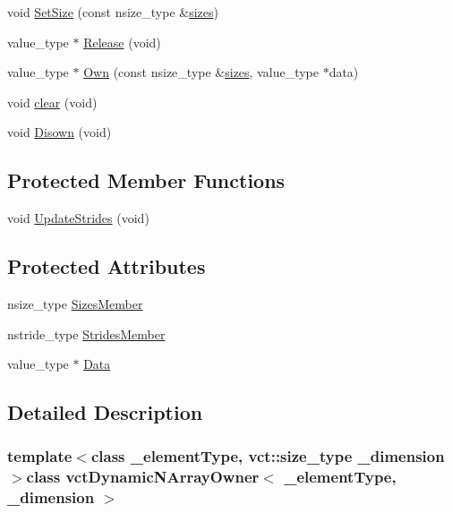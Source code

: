 \begin{DoxyCompactItemize}
\item 
void \hyperlink{classvct_dynamic_n_array_owner_ad3018a162b6670166cb3f2962c205fb2}{Set\-Size} (const nsize\-\_\-type \&\hyperlink{classvct_dynamic_n_array_owner_a014679026d1c8b3c3f07170c58ece520}{sizes})
\item 
value\-\_\-type $\ast$ \hyperlink{classvct_dynamic_n_array_owner_a7fe967c37e7e574c5756043b54780231}{Release} (void)
\item 
value\-\_\-type $\ast$ \hyperlink{classvct_dynamic_n_array_owner_a352c3d4945571ee24a82156cc0c412a3}{Own} (const nsize\-\_\-type \&\hyperlink{classvct_dynamic_n_array_owner_a014679026d1c8b3c3f07170c58ece520}{sizes}, value\-\_\-type $\ast$data)
\item 
void \hyperlink{classvct_dynamic_n_array_owner_af9a8488a90e75a1a4a56a6515b646f6c}{clear} (void)
\item 
void \hyperlink{classvct_dynamic_n_array_owner_af638b7b4d0a7423363f5a026ec9bd0ca}{Disown} (void)
\end{DoxyCompactItemize}
\subsection*{Protected Member Functions}
\begin{DoxyCompactItemize}
\item 
void \hyperlink{classvct_dynamic_n_array_owner_a07a905156b3ed0bc51ef9ec4547a32f8}{Update\-Strides} (void)
\end{DoxyCompactItemize}
\subsection*{Protected Attributes}
\begin{DoxyCompactItemize}
\item 
nsize\-\_\-type \hyperlink{classvct_dynamic_n_array_owner_af107a6047ac88e19634d12fbd93e6267}{Sizes\-Member}
\item 
nstride\-\_\-type \hyperlink{classvct_dynamic_n_array_owner_a7a9e21f0f52c3ca29da81f404eaaafcb}{Strides\-Member}
\item 
value\-\_\-type $\ast$ \hyperlink{classvct_dynamic_n_array_owner_a8b99109f919dd5b01605368e2eb06ca4}{Data}
\end{DoxyCompactItemize}


\subsection{Detailed Description}
\subsubsection*{template$<$class \-\_\-element\-Type, vct\-::size\-\_\-type \-\_\-dimension$>$class vct\-Dynamic\-N\-Array\-Owner$<$ \-\_\-element\-Type, \-\_\-dimension $>$}

